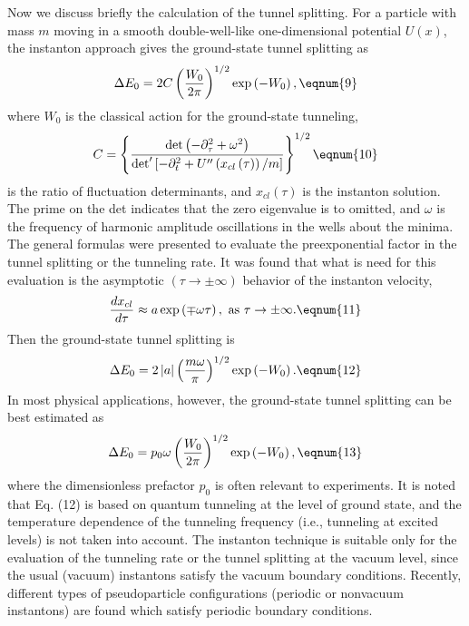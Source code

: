 Now we discuss briefly the calculation of the tunnel splitting. For a
particle with mass $m$ moving in a smooth double-well-like one-dimensional
potential $U\left( x\right) $, the instanton approach gives the ground-state
tunnel splitting as\cite{23} 
\begin{equation}
\Delta E_0=2C\left( \frac{W_0}{2\pi }\right) ^{1/2}\exp \left( -W_0\right) ,
\eqnum{9}
\end{equation}
where $W_0$ is the classical action for the ground-state tunneling, 
\begin{equation}
C=\left\{ \frac{\det \left( -\partial _\tau ^2+\omega ^2\right) }{%
\det^{\prime }\left[ -\partial _t^2+U^{\prime \prime }\left( x_{cl}\left(
\tau \right) \right) /m\right] }\right\} ^{1/2}  \eqnum{10}
\end{equation}
is the ratio of fluctuation determinants, and $x_{cl}\left( \tau \right) $
is the instanton solution. The prime on the det indicates that the zero
eigenvalue is to omitted, and $\omega $ is the frequency of harmonic
amplitude oscillations in the wells about the minima. The general formulas
were presented to evaluate the preexponential factor in the tunnel splitting
or the tunneling rate.\cite{23,24} It was found that what is need for this
evaluation is the asymptotic $\left( \tau \rightarrow \pm \infty \right) $
behavior of the instanton velocity, 
\begin{equation}
\frac{dx_{cl}}{d\tau }\approx a\exp \left( \mp \omega \tau \right) ,\text{
as }\tau \rightarrow \pm \infty .  \eqnum{11}
\end{equation}
Then the ground-state tunnel splitting is\cite{23,24} 
\begin{equation}
\Delta E_0=2\left| a\right| \left( \frac{m\omega }\pi \right) ^{1/2}\exp
\left( -W_0\right) .  \eqnum{12}
\end{equation}
In most physical applications, however, the ground-state tunnel splitting
can be best estimated as 
\begin{equation}
\Delta E_0=p_0\omega \left( \frac{W_0}{2\pi }\right) ^{1/2}\exp \left(
-W_0\right) ,  \eqnum{13}
\end{equation}
where the dimensionless prefactor $p_0$ is often relevant to experiments. It
is noted that Eq. (12) is based on quantum tunneling at the level of ground
state, and the temperature dependence of the tunneling frequency (i.e.,
tunneling at excited levels) is not taken into account. The instanton
technique is suitable only for the evaluation of the tunneling rate or the
tunnel splitting at the vacuum level, since the usual (vacuum) instantons
satisfy the vacuum boundary conditions. Recently, different types of
pseudoparticle configurations (periodic or nonvacuum instantons) are found
which satisfy periodic boundary conditions.\cite{25}

